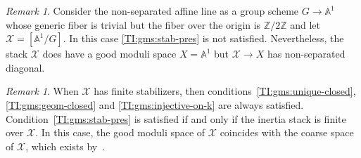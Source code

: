 \documentclass[a4paper]{amsart}
\theoremstyle{plain}
\theoremstyle{definition}
\theoremstyle{remark}
\newtheorem{remark}[theorem]{Remark}
\numberwithin{equation}{section}
\renewcommand\AA{\mathbb{A}}
\newcommand\ZZ{\mathbb{Z}}
\newcommand\cX{\mathcal{X}}
\newcommand{\itemref}[1]{\eqref{#1}}
\begin{document}
\begin{remark}
Consider the non-separated affine line as a group scheme $G \to \AA^1$ whose
generic fiber is trivial but the fiber over the origin is $\ZZ/2\ZZ$ and let
$\cX=[\AA^1/G]$. In this case
\itemref{TI:gms:stab-pres} is not satisfied. Nevertheless, the stack
$\cX$ does have a good moduli space $X=\AA^1$ but $\cX\to X$ has
non-separated diagonal.
\end{remark}

\begin{remark}
When $\cX$ has finite stabilizers, then
conditions~\itemref{TI:gms:unique-closed}, \itemref{TI:gms:geom-closed} and
\itemref{TI:gms:injective-on-k} are always
satisfied. Condition~\itemref{TI:gms:stab-pres} is satisfied if and only if the
inertia stack is finite over $\cX$. In this case, the good moduli space of $\cX$
coincides with the coarse space of $\cX$, which exists by~\cite{keel-mori}.
\end{remark}
\end{document}
